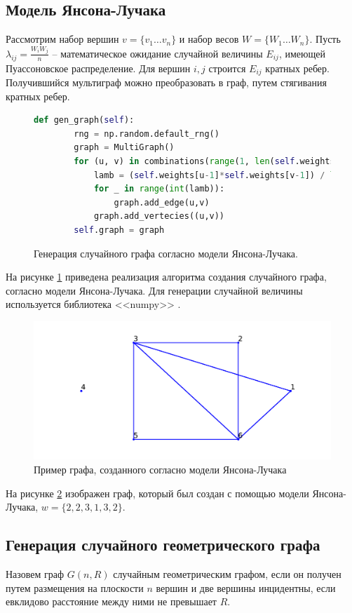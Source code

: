 \subsection{Модель Янсона-Лучака}
Рассмотрим набор вершин $v = \{v_1 \dots v_{n}\}$ и набор весов
$W = \{W_1 \dots W_{n}\}$.  Пусть
$\lambda_{ij} = \frac{W_{i} W_{j} }{n}$ -- математическое 
ожидание случайной величины $E_{ij}$, имеющей Пуассоновское распределение. Для вершин $i,j$ строится  $E_{ij}$ кратных ребер.
Получившийся мультиграф можно преобразовать в граф,
путем стягивания кратных ребер.
\begin{figure}[H] 
\begin{lstlisting}[language=Python] 
    def gen_graph(self):
        rng = np.random.default_rng()
        graph = MultiGraph()
        for (u, v) in combinations(range(1, len(self.weights)+1), 2):
            lamb = (self.weights[u-1]*self.weights[v-1]) / len(self.weights)
            for _ in range(int(lamb)):
                graph.add_edge(u,v)
            graph.add_vertecies((u,v))
        self.graph = graph
\end{lstlisting}  
    \caption{Генерация случайного графа согласно модели Янсона-Лучака.}
    \label{jason_1}
\end{figure} 
На рисунке \ref{jason_1} приведена реализация алгоритма 
создания случайного графа, согласно модели Янсона-Лучака.
Для генерации случайной величины используется библиотека <<numpy>> \cite{numpy}.
\begin{figure}[H] 
    \includegraphics{jason.pdf} 
    \caption{Пример графа, созданного согласно модели Янсона-Лучака}
    \label{jason_2}
\end{figure} 
На рисунке \ref{jason_2} изображен граф, который был создан с 
помощью модели Янсона-Лучака, $w = \{2,2,3,1,3,2\} $.
\subsection{Генерация случайного геометрического графа}
Назовем граф $G(n,R)$ случайным геометрическим 
графом, если он получен путем размещения
на плоскости  $n$ вершин и две вершины
инцидентны, если евклидово расстояние между ними не превышает  $R$.
